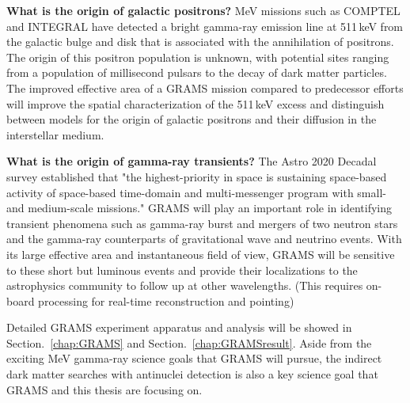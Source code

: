 \noindent\textbf{What is the origin of galactic positrons?} MeV missions such as COMPTEL and INTEGRAL have detected a bright gamma-ray emission line at 511\,keV from the galactic bulge and disk that is associated with the annihilation of positrons. The origin of this positron population is unknown, with potential sites ranging from a population of millisecond pulsars to the decay of dark matter particles. The improved effective area of a \ac{GRAMS} mission compared to predecessor efforts will improve the spatial characterization of the 511\,keV excess and distinguish between models for the origin of galactic positrons and their diffusion in the interstellar medium.

\noindent\textbf{What is the origin of gamma-ray transients?} The Astro 2020 Decadal survey established that "the highest-priority in space is sustaining space-based activity of space-based time-domain and multi-messenger program with small- and medium-scale missions." \ac{GRAMS} will play an important role in identifying transient phenomena such as gamma-ray burst and mergers of two neutron stars and the gamma-ray counterparts of gravitational wave and neutrino events. With its large effective area and instantaneous field of view, \ac{GRAMS} will be sensitive to these short but luminous events and provide their localizations to the astrophysics community to follow up at other wavelengths. (This requires on-board processing for real-time reconstruction and pointing)

Detailed \ac{GRAMS} experiment apparatus and analysis will be showed in Section.~\ref{chap:GRAMS} and Section.~\ref{chap:GRAMSresult}. Aside from the exciting MeV gamma-ray science goals that \ac{GRAMS} will pursue, the indirect dark matter searches with antinuclei detection is also a key science goal that \ac{GRAMS} and this thesis are focusing on. 